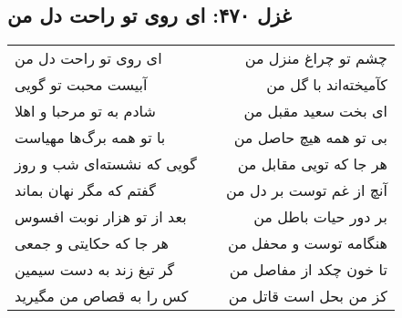 \begin{center}
\section*{غزل ۴۷۰: ای روی تو راحت دل من}
\label{sec:470}
\begin{longtable}{l p{0.5cm} r}
ای روی تو راحت دل من
&&
چشم تو چراغ منزل من
\\
آبیست محبت تو گویی
&&
کآمیخته‌اند با گل من
\\
شادم به تو مرحبا و اهلا
&&
ای بخت سعید مقبل من
\\
با تو همه برگ‌ها مهیاست
&&
بی تو همه هیچ حاصل من
\\
گویی که نشسته‌ای شب و روز
&&
هر جا که تویی مقابل من
\\
گفتم که مگر نهان بماند
&&
آنچ از غم توست بر دل من
\\
بعد از تو هزار نوبت افسوس
&&
بر دور حیات باطل من
\\
هر جا که حکایتی و جمعی
&&
هنگامه توست و محفل من
\\
گر تیغ زند به دست سیمین
&&
تا خون چکد از مفاصل من
\\
کس را به قصاص من مگیرید
&&
کز من بحل است قاتل من
\\
\end{longtable}
\end{center}
